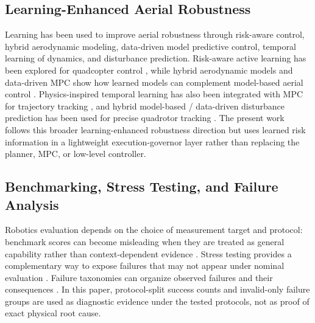 
\subsection{Learning-Enhanced Aerial Robustness}

Learning has been used to improve aerial robustness through risk-aware control,
hybrid aerodynamic modeling, data-driven model predictive control, temporal
learning of dynamics, and disturbance prediction. Risk-aware active learning
has been explored for quadcopter control
\cite{Andersson2017RiskAwareActiveLearning}, while hybrid aerodynamic models
and data-driven MPC show how learned models can complement model-based aerial
control \cite{Bauersfeld2021NeuroBEM,Torrente2021DataDrivenMPC}.
Physics-inspired temporal learning has also been integrated with MPC for
trajectory tracking \cite{Saviolo2022PITCN}, and hybrid model-based /
data-driven disturbance prediction has been used for precise quadrotor
tracking \cite{Lee2024HybridDisturbancePrediction}. The present work follows
this broader learning-enhanced robustness direction but uses learned risk
information in a lightweight execution-governor layer rather than replacing
the planner, MPC, or low-level controller.


\subsection{Benchmarking, Stress Testing, and Failure Analysis}

Robotics evaluation depends on the choice of measurement target and protocol:
benchmark scores can become misleading when they are treated as general
capability rather than context-dependent evidence
\cite{Muller2019MeasureTargetConfusion}. Stress testing provides a
complementary way to expose failures that may not appear under nominal
evaluation \cite{Koren2018AdaptiveStressTesting,Nalic2020StressTestingScenarioBasedADS}.
Failure taxonomies can organize observed failures and their consequences
\cite{Cameron2024DomesticRobotFailureOutcomes}. In this paper, protocol-split
success counts and invalid-only failure groups are used as diagnostic evidence
under the tested protocols, not as proof of exact physical root cause.


